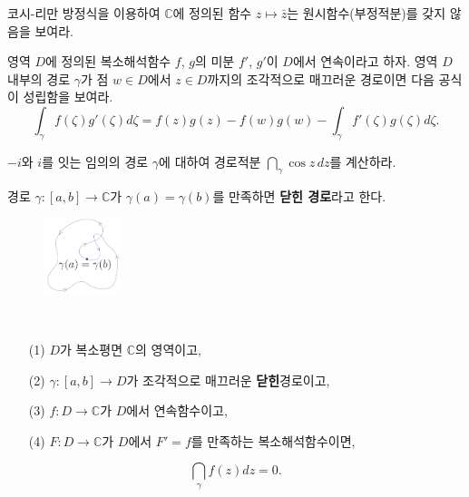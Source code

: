 \begin{salt_exercise} \label{ex-3-11}
코시-리만 방정식을 이용하여
$\mathbb C$에 정의된 함수 $z \mapsto \bar z$는 원시함수(부정적분)를 
갖지 않음을 보여라.
\end{salt_exercise}

\begin{salt_exercise}[부분적분 공식] \label{ex-3-12}
영역 $D$에 정의된 복소해석함수 $f$, $g$의 미분
$f'$, $g'$이 $D$에서 연속이라고 하자.
영역 $D$ 내부의 경로 $\gamma$가 
점 $w\in D$에서 $z\in D$까지의  조각적으로 매끄러운 경로이면
다음 공식이 성립함을 보여라.
\[
\int_\gamma f(\zeta)g'(\zeta)d\zeta 
= f(z)g(z) - f(w)g(w) - \int_\gamma f'(\zeta)g(\zeta)d\zeta.
\]
\end{salt_exercise}

\begin{salt_exercise} \label{ex-3-13}
$-i$와 $i$를 잇는 임의의 경로 $\gamma$에 대하여
경로적분 $\dint_\gamma \cos z\, dz$를 계산하라.
\end{salt_exercise}

\begin{saltdefinition}{}{} \label{def-3-2}
경로 $\gamma:[a,b] \to \mathbb C$가
$\gamma(a)= \gamma(b)$를 만족하면 {\bf 닫힌 경로}라고 한다.
\end{saltdefinition}

\begin{figure}[!h]
\begin{center}
\includegraphics[width=0.2\textwidth]{./SaltChapter/figs/fig-3-0-1}
\end{center}
\end{figure}

\begin{salt_corollary} \label{coro-3-1}
\
\begin{itemize}
\item[(1)] $D$가 복소평면 $\mathbb C$의 영역이고,
\item[(2)] $\gamma : [a,b] \to D$가 조각적으로 매끄러운 {\bf 닫힌}경로이고,
\item[(3)] $f:D\to\mathbb C$가 $D$에서 연속함수이고,
\item[(4)] $F:D\to \mathbb C$가 $D$에서 $F'=f$를 만족하는 복소해석함수이면,
\end{itemize}
\[
\dint_\gamma f(z)dz = 0.
\]
\end{salt_corollary}

